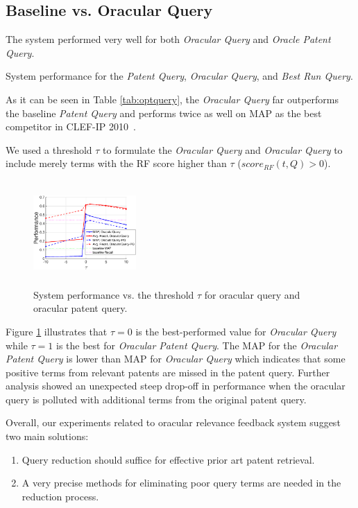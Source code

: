\subsection{Baseline vs. Oracular Query}
The system performed very well for both {\em Oracular Query} and {\em Oracle Patent Query}.  
\begin{table}[htpb]
  \begin{center}
   \caption{System performance for the {\em Patent Query}, {\em Oracular Query}, and {\em Best Run Query}.}
   \vspace*{1ex}
     
  \label{tab:optquery}
  \end{center}  
\end{table}
As it can be seen in Table \ref{tab:optquery}, the {\em Oracular Query} far outperforms the baseline {\em Patent Query} and performs twice as well on MAP as the best competitor in CLEF-IP 2010~\cite{lopez2010experiments}.

We used a threshold $\tau$ to formulate the {\em Oracular Query} and {\em Oracular Query} to include merely terms with the RF score higher than $\tau$ ($score_{RF}(t,Q)>0$). 
\begin{figure}[htpb]
   \centering
   \includegraphics[width=0.35\textwidth,height=40mm]{figs/oracularquery2.eps}
   \caption{System performance vs. the threshold $\tau$ for oracular query and oracular patent query.}   
   \label{fig:oracular} 
\end{figure} 
Figure \ref{fig:oracular} illustrates that $\tau=0$ is the best-performed value for {\em Oracular Query} while $\tau=1$ is the best for {\em Oracular Patent Query}. The MAP for the {\em Oracular Patent Query} is lower than MAP for {\em Oracular Query} which indicates that some positive terms from relevant patents are missed in the patent query. Further analysis showed an unexpected steep drop-off in performance when the oracular query is polluted with additional terms from the original patent query. 

Overall, our experiments related to oracular relevance feedback system suggest two main solutions:
\begin{enumerate}
  \item Query reduction should suffice for effective prior art patent retrieval.
  \item A very precise methods for eliminating poor query terms are needed in the reduction process.
\end{enumerate}